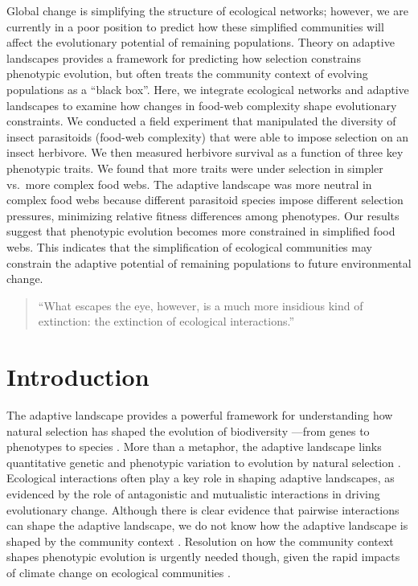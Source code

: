 \documentclass[11pt,]{article}
\begin{document}
Global change is simplifying the structure of ecological networks;
however, we are currently in a poor position to predict how these
simplified communities will affect the evolutionary potential of
remaining populations. Theory on adaptive landscapes provides a
framework for predicting how selection constrains phenotypic evolution,
but often treats the community context of evolving populations as a
``black box''. Here, we integrate ecological networks and adaptive
landscapes to examine how changes in food-web complexity shape
evolutionary constraints. We conducted a field experiment that
manipulated the diversity of insect parasitoids (food-web complexity)
that were able to impose selection on an insect herbivore. We then
measured herbivore survival as a function of three key phenotypic
traits. We found that more traits were under selection in simpler
vs.~more complex food webs. The adaptive landscape was more neutral in
complex food webs because different parasitoid species impose different
selection pressures, minimizing relative fitness differences among
phenotypes. Our results suggest that phenotypic evolution becomes more
constrained in simplified food webs. This indicates that the
simplification of ecological communities may constrain the adaptive
potential of remaining populations to future environmental change.

\newpage

\begin{quote}
``What escapes the eye, however, is a much more insidious kind of
extinction: the extinction of ecological interactions.''
\citet{Janzen1974}
\end{quote}

\section{Introduction}\label{introduction}

The adaptive landscape provides a powerful framework for understanding
how natural selection has shaped the evolution of biodiversity ---from
genes to phenotypes to species
\citep{Wright1931, Simpson1944, Arnold2001}. More than a metaphor, the
adaptive landscape links quantitative genetic and phenotypic variation
to evolution by natural selection
\citep{Lande1979, Arnold1984applications, Arnold1984theory}. Ecological
interactions often play a key role in shaping adaptive landscapes, as
evidenced by the role of antagonistic \citep{Schluter2000, Abrams2000}
and mutualistic \citep{Bronstein2006} interactions in driving
evolutionary change. Although there is clear evidence that pairwise
interactions can shape the adaptive landscape, we do not know how the
adaptive landscape is shaped by the community context
\citep{McPeek2017, terHorst2018}. Resolution on how the community
context shapes phenotypic evolution is urgently needed though, given the
rapid impacts of climate change on ecological communities
\citep{Scheffers2016}.
\end{document}
